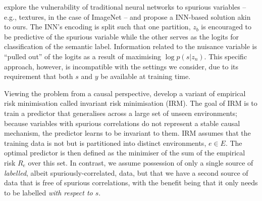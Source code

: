 \citet{JacBehZemBet19} explore the vulnerability of traditional neural networks to spurious
variables -- e.g., textures, in the case of ImageNet \citep{Geir18} -- and propose a INN-based
solution akin to ours. The INN's encoding is split such that one partition, $z_b$ is encouraged to
be predictive of the spurious variable while the other serves as the logits for classification of
the semantic label. Information related to the nuisance variable is ``pulled out'' of the logits as
a result of maximising $\log p(s|z_n)$. This specific approach, however, is incompatible with the
settings we consider, due to its requirement that both $s$ and $y$ be available at training time.

Viewing the problem from a causal perspective, \citet{arjovsky2019invariant} develop a variant of
empirical risk minimisation called invariant risk minimisation (IRM). The goal of IRM is to train a
predictor that generalises across a large set of unseen environments; because variables with
spurious correlations do not represent a stable causal mechanism, the predictor learns to be
invariant to them. IRM assumes that the training data is not \emph{\iid{}} but is partitioned into
distinct environments, $e \in E$. The optimal predictor is then defined as the minimiser of the sum
of the empirical risk $R_e$ over this set. In contrast, we assume possession of only a single
source of \emph{labelled}, albeit spuriously-correlated, data, but that we have a second source of
data that is free of spurious correlations, with the benefit being that it only needs to be
labelled \emph{with respect to $s$}.


